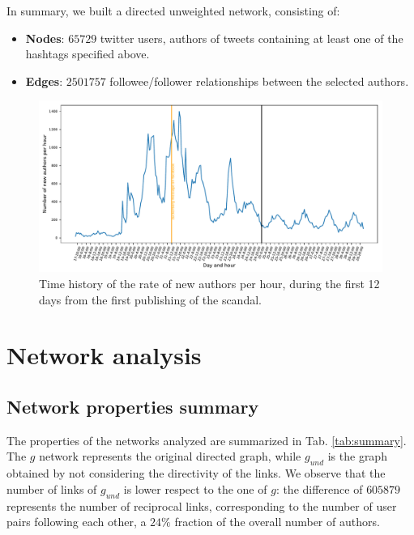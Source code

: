 \documentclass[11pt, twoside]{report}
\begin{document}
    In summary, we built a directed unweighted network, consisting of:

    \begin{itemize}
    \item \textbf{Nodes}: $65729$ twitter users, authors of tweets containing at least one of the hashtags specified above.

    \item \textbf{Edges}: $2501757$ followee/follower relationships between the selected authors.
    \end{itemize}


    
    \begin{figure}[htbp]
      \centering
\includegraphics[width=\textwidth]{../../scripts/network_analysis/imgs/time_history.pdf}
      \caption{Time history of the rate of new authors per hour, during the first 12 days from the first publishing of the scandal.}
      \label{fig:time_history}
    \end{figure}



    
    \chapter{Network analysis}
\section{Network properties summary} 


The properties of the networks analyzed are summarized in Tab. \ref{tab:summary}. The $g$ network represents the original directed graph, while
$g_{und}$ is the graph obtained by not considering the directivity of the links. We observe that the number of links of $g_{und}$ is lower respect to the one of $g$: the difference of $605879$ represents the number of reciprocal links, corresponding to the number of user pairs following each other, a $24\%$ fraction of the overall number of authors.
\end{document}
